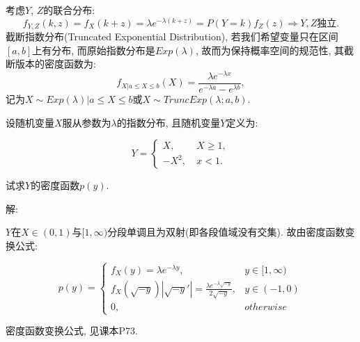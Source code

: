 \documentclass[standard]{ExBook}
\begin{document}
\begin{qitems}
\begin{bbox}
考虑$Y$, $Z$的联合分布:
$$f_{Y,Z}(k,z)=f_{X}(k+z)=\lambda e^{-\lambda(k+z)}=P(Y=k)f_{Z}(z) \Longrightarrow Y, Z\text{独立}.$$
\textcolor{themeColor}{\selectfont {} 截断指数分布(Truncated Exponential Distribution), 若我们希望变量只在区间$[a,b]$上有分布, 而原始指数分布是$Exp(\lambda)$, 故而为保持概率空间的规范性, 其截断版本的密度函数为:
$$f_{X|a\leq X\leq b}(X)=\displaystyle\frac{\lambda e^{-\lambda x}}{e^{-\lambda a}-e^{\lambda b}},$$
记为$X\sim Exp(\lambda)|a\leq X\leq b$或$X\sim TruncExp(\lambda;a,b)$.}
    \end{bbox}

\vspace{-5em}

    \begin{bbox}
    \begin{shaded}
        \qitem
设随机变量$X$服从参数为$\lambda$的指数分布, 且随机变量$Y$定义为:
\vspace{-2em}
\begin{center}
\begin{equation}
    Y=
    \left\{
    \begin{array}{cl}
        \nonumber
        X,\ &X \geq 1,\\
        -X^2,\ &x < 1.
    \end{array}
    \right.
\end{equation}
\end{center}
试求$Y$的密度函数$p(y)$.
    \end{shaded}
    \end{bbox}

\vspace{-5em}

    \begin{bbox}
解: 

$Y$在$X\in(0,1)$与$[1,\infty)$分段单调且为双射(即各段值域没有交集). 故由密度函数变换公式:
\vspace{-2em}
\begin{center}
\begin{equation}
    p(y)=
    \left\{
    \begin{array}{cl}
        \nonumber
        f_{X}(y)=\lambda e^{-\lambda y}, &y\in[1,\infty)\\
        f_{X}(\sqrt{-y})|\sqrt{-y}'|=\displaystyle\frac{\lambda e^{-\lambda\sqrt{-y}}}{2\sqrt{-y}}, &y\in(-1,0)\\
        0, &otherwise
    \end{array}
    \right.
\end{equation}
\end{center}
\textcolor{themeColor}{\selectfont {} 密度函数变换公式, 见课本P73.}
    \end{bbox}


\end{qitems}
\end{document}
